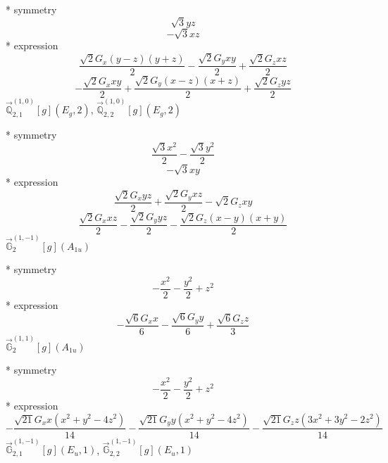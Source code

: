 \documentclass[fleqn,8pt]{jsarticle}
\begin{document}
\noindent\quad ** symmetry
\begin{dmath*}
\sqrt{3} y z
\end{dmath*}
\begin{dmath*}
- \sqrt{3} x z
\end{dmath*}
\noindent\quad ** expression
\begin{dmath*}
\frac{\sqrt{2} G_{x} \left(y - z\right) \left(y + z\right)}{2} - \frac{\sqrt{2} G_{y} x y}{2} + \frac{\sqrt{2} G_{z} x z}{2}
\end{dmath*}
\begin{dmath*}
- \frac{\sqrt{2} G_{x} x y}{2} + \frac{\sqrt{2} G_{y} \left(x - z\right) \left(x + z\right)}{2} + \frac{\sqrt{2} G_{z} y z}{2}
\end{dmath*}
\noindent\quad $\vec{\mathbb{Q}}_{2,1}^{(1,0)}[g](E_{g},2)$, $\vec{\mathbb{Q}}_{2,2}^{(1,0)}[g](E_{g},2)$

\noindent\quad ** symmetry
\begin{dmath*}
\frac{\sqrt{3} x^{2}}{2} - \frac{\sqrt{3} y^{2}}{2}
\end{dmath*}
\begin{dmath*}
- \sqrt{3} x y
\end{dmath*}
\noindent\quad ** expression
\begin{dmath*}
\frac{\sqrt{2} G_{x} y z}{2} + \frac{\sqrt{2} G_{y} x z}{2} - \sqrt{2} G_{z} x y
\end{dmath*}
\begin{dmath*}
\frac{\sqrt{2} G_{x} x z}{2} - \frac{\sqrt{2} G_{y} y z}{2} - \frac{\sqrt{2} G_{z} \left(x - y\right) \left(x + y\right)}{2}
\end{dmath*}
\noindent\quad $\vec{\mathbb{G}}_{2}^{(1,-1)}[g](A_{1u})$

\noindent\quad ** symmetry
\begin{dmath*}
- \frac{x^{2}}{2} - \frac{y^{2}}{2} + z^{2}
\end{dmath*}
\noindent\quad ** expression
\begin{dmath*}
- \frac{\sqrt{6} G_{x} x}{6} - \frac{\sqrt{6} G_{y} y}{6} + \frac{\sqrt{6} G_{z} z}{3}
\end{dmath*}
\noindent\quad $\vec{\mathbb{G}}_{2}^{(1,1)}[g](A_{1u})$

\noindent\quad ** symmetry
\begin{dmath*}
- \frac{x^{2}}{2} - \frac{y^{2}}{2} + z^{2}
\end{dmath*}
\noindent\quad ** expression
\begin{dmath*}
- \frac{\sqrt{21} G_{x} x \left(x^{2} + y^{2} - 4 z^{2}\right)}{14} - \frac{\sqrt{21} G_{y} y \left(x^{2} + y^{2} - 4 z^{2}\right)}{14} - \frac{\sqrt{21} G_{z} z \left(3 x^{2} + 3 y^{2} - 2 z^{2}\right)}{14}
\end{dmath*}
\noindent\quad $\vec{\mathbb{G}}_{2,1}^{(1,-1)}[g](E_{u},1)$, $\vec{\mathbb{G}}_{2,2}^{(1,-1)}[g](E_{u},1)$
\end{document}

